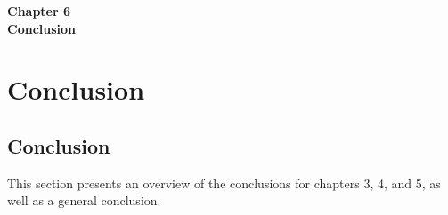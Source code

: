 

            
\pagecolor{mygray}

\begin{titlepage}
   \begin{center}
       \vspace*{3cm}
       {\fontsize{40pt}{46pt}\selectfont \textbf{Chapter 6}}\\       
       \vspace*{5cm}
       {\fontsize{30pt}{36pt}\selectfont \textbf{Conclusion}}   
   \end{center}
\end{titlepage}

\restoregeometry
\pagecolor{white}


\chapter{ Conclusion}
\label{ch:ch6_conclusion}



\section{Conclusion}


This section presents an overview of the conclusions for chapters 3, 4, and 5, as well as a general conclusion. \\


